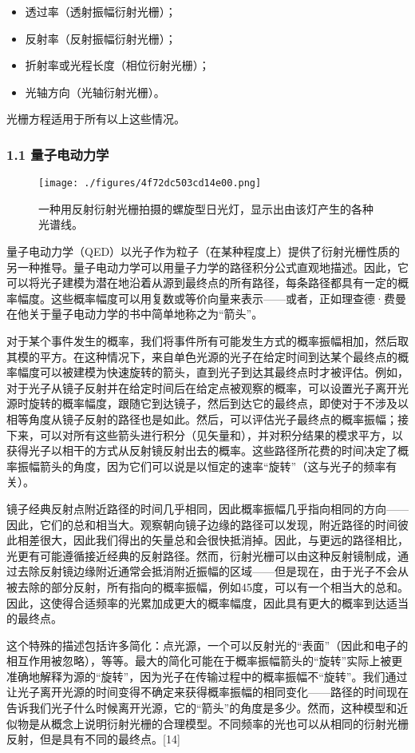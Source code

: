 \begin{itemize}
\item 透过率（透射振幅衍射光栅）；
\item 反射率（反射振幅衍射光栅）；
\item 折射率或光程长度（相位衍射光栅）；
\item 光轴方向（光轴衍射光栅）。
\end{itemize}

光栅方程适用于所有以上这些情况。

\subsubsection{1.1 量子电动力学}
\begin{figure}[ht]
\centering
\texttt{[image: ./figures/4f72dc503cd14e00.png]}
\caption{一种用反射衍射光栅拍摄的螺旋型日光灯，显示出由该灯产生的各种光谱线。} \label{fig_YSGS_4}
\end{figure}
量子电动力学（QED）以光子作为粒子（在某种程度上）提供了衍射光栅性质的另一种推导。量子电动力学可以用量子力学的路径积分公式直观地描述。因此，它可以将光子建模为潜在地沿着从源到最终点的所有路径，每条路径都具有一定的概率幅度。这些概率幅度可以用复数或等价向量来表示——或者，正如理查德·费曼在他关于量子电动力学的书中简单地称之为“箭头”。

对于某个事件发生的概率，我们将事件所有可能发生方式的概率振幅相加，然后取其模的平方。在这种情况下，来自单色光源的光子在给定时间到达某个最终点的概率幅度可以被建模为快速旋转的箭头，直到光子到达其最终点时才被评估。例如，对于光子从镜子反射并在给定时间后在给定点被观察的概率，可以设置光子离开光源时旋转的概率幅度，跟随它到达镜子，然后到达它的最终点，即使对于不涉及以相等角度从镜子反射的路径也是如此。然后，可以评估光子最终点的概率振幅；接下来，可以对所有这些箭头进行积分（见矢量和），并对积分结果的模求平方，以获得光子以相干的方式从反射镜反射出去的概率。这些路径所花费的时间决定了概率振幅箭头的角度，因为它们可以说是以恒定的速率“旋转”（这与光子的频率有关）。

镜子经典反射点附近路径的时间几乎相同，因此概率振幅几乎指向相同的方向——因此，它们的总和相当大。观察朝向镜子边缘的路径可以发现，附近路径的时间彼此相差很大，因此我们得出的矢量总和会很快抵消掉。因此，与更远的路径相比，光更有可能遵循接近经典的反射路径。然而，衍射光栅可以由这种反射镜制成，通过去除反射镜边缘附近通常会抵消附近振幅的区域——但是现在，由于光子不会从被去除的部分反射，所有指向的概率振幅，例如45度，可以有一个相当大的总和。因此，这使得合适频率的光累加成更大的概率幅度，因此具有更大的概率到达适当的最终点。

这个特殊的描述包括许多简化：点光源，一个可以反射光的“表面”（因此和电子的相互作用被忽略），等等。最大的简化可能在于概率振幅箭头的“旋转”实际上被更准确地解释为源的“旋转”，因为光子在传输过程中的概率振幅不“旋转”。我们通过让光子离开光源的时间变得不确定来获得概率振幅的相同变化——路径的时间现在告诉我们光子什么时候离开光源，它的“箭头”的角度是多少。然而，这种模型和近似物是从概念上说明衍射光栅的合理模型。不同频率的光也可以从相同的衍射光栅反射，但是具有不同的最终点。[14]